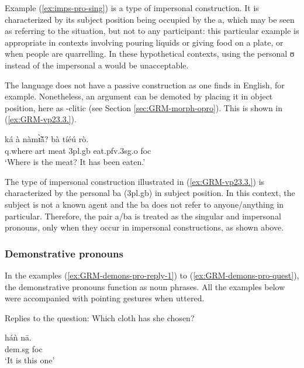 \begin{exe}
\begin{exe}
\begin{exe}
\begin{exe}
\begin{exe}
\begin{exe}
\begin{exe}
\begin{exe}
\begin{exe}
Example (\ref{ex:imps-pro-sing}) is a type of impersonal construction.  It is 
characterized by its  subject position being  occupied by the  {\sls a}, which may be seen 
as 
referring to the situation,  but not to any participant: this particular example is appropriate in 
contexts involving pouring  liquids or giving food on a plate, or when people are quarrelling. In 
these hypothetical contexts, using the personal  {\sls ʊ} instead of  the  impersonal 
 {\sls a} would be unacceptable.  

The language does not have a passive construction as one finds in English, for example. Nonetheless, an argument  can be demoted  by placing it in object position, here as -clitic  (see Section \ref{sec:GRM-morph-opro}). This is shown in (\ref{ex:GRM-vp23.3.}).


\ea\label{ex:GRM-vp23.3.}
\gll ká à nàmɪ̃̀ã́?  bà tíéú rò.\\
   {\sc q}.where {\sc art} meat {\sc 3pl.g}b  eat.{\sc pfv}.{\sc 3sg.o} 
{\sc foc}\\
\glt  `Where is the meat? It has been eaten.'
\z


The type of impersonal construction illustrated in  (\ref{ex:GRM-vp23.3.})  is characterized by the personal  {\sls ba} ({\sc 3pl.g}b)  in subject position. In this context,  the subject is not a known agent and the  {\sls ba} does not refer to anyone/anything in particular. Therefore,  the pair {\sls a}/{\sls ba} is treated  as the singular and  impersonal pronouns, only when they occur in impersonal constructions, as shown above.



\subsubsection{Demonstrative pronouns}
\label{sec:GRM-demons-pro}


In the examples (\ref{ex:GRM-demons-pro-reply-1}) to (\ref{ex:GRM-demons-pro-quest}),  the demonstrative pronouns  function as noun phrases. All the examples below were accompanied with pointing gestures when uttered.

\ea\label{ex:GRM-demons-pro-reply-1}{\rm Replies to the question: Which cloth
has she chosen?}
 
 
  \ea\label{ex:GRM-demons-pro-reply-1sg} 
 \gll háǹ nā.\\
   {\sc dem.sg} {\sc foc}\\
 \glt `It is this one' 
   

\end{exe}
\end{exe}
\end{exe}
\end{exe}
\end{exe}
\end{exe}
\end{exe}
\end{exe}
\end{exe}
